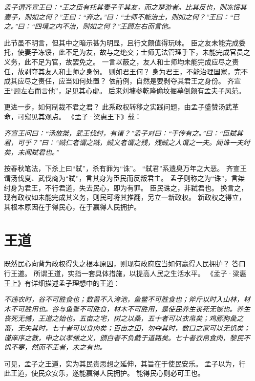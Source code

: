 \documentclass[11pt]{article}
\begin{document}
\textit{孟子谓齐宣王曰：“王之臣有托其妻子于其友，而之楚游者。比其反也，则冻馁其妻子，则如之何？”王曰：“弃之。”曰：“士师不能治士，则如之何？”王曰：“已之。”曰：“四境之内不治，则如之何？”王顾左右而言他。}

此节虽不明言，但其中之暗示甚为明显，且行文颇值得玩味。
臣之友未能完成委托，使妻子冻馁，此不足为友，故与之绝交；士师无法管理手下，未能完成官员之义务，此不足为官，故罢免之。
一言以蔽之，友人和士师均未能完成应尽之责任，故剥夺其友人和士师之身份。
则如君王何？
身为君王，不能治理国家，完不成其应尽之责任，应当如何处置？
依前例，自然是要剥夺其君王之身份。
齐宣王“顾左右而言他”，足见其心虚。
后来刘墉参乾隆偷坟掘墓倒颇有孟夫子风范。

\par

更进一步，如何制裁不君之君？
此系政权转移之实践问题，由孟子盛赞汤武革命，可窥见其观点。
《孟子·梁惠王下》载：

\textit{齐宣王问曰：“汤放桀，武王伐纣，有诸？”孟子对曰：“于传有之。”曰：“臣弑其君，可乎？”曰：“贼仁者谓之贼，贼义者谓之残，残贼之人谓之一夫。闻诛一夫纣矣，未闻弑君也。”}

按春秋笔法，下杀上曰“弑”，杀有罪为“诛”。
“弑君”系遗臭万年之大恶。
齐宣王谓汤伐夏、武伐商为“弑”，言其身为臣民而反叛君主。
孟子则称之为“诛”，言桀纣身为君王，不行君道，失去民心，即为有罪。
臣民诛之，非弑君也。
换言之，现有政权如未能完成其义务，则民可将其推翻，另立一新政权。
新政权之得立，其根本原因在于得民心，在于赢得人民拥护。
  
\section{王道}
既然民心向背为政权得失之根本原因，则现有政府应当如何赢得人民拥护？
答曰行王道。
所谓王道，实指一套具体措施，以提高人民之生活水平。
《孟子·梁惠王上》有详细描述孟子理想中的王道：
  
\textit{不违农时，谷不可胜食也；数罟不入洿池，鱼鳖不可胜食也；斧斤以时入山林，材木不可胜用也。谷与鱼鳖不可胜食，材木不可胜用，是使民养生丧死无憾也。养生丧死无憾，王道之始也。五亩之宅，树之以桑，五十者可以衣帛矣；鸡豚狗彘之畜，无失其时，七十者可以食肉矣；百亩之田，勿夺其时，数口之家可以无饥矣；谨庠序之教，申之以孝悌之义，颁白者不负戴于道路矣。七十者衣帛食肉，黎民不饥不寒，然而不王者，未之有也。}

可见，孟子之王道，实为其民贵思想之延伸，其旨在于使民安乐。
孟子以为，行此王道，使民众安乐，遂能赢得人民拥护。
能得民心则必可王也。

\par
\end{document}
